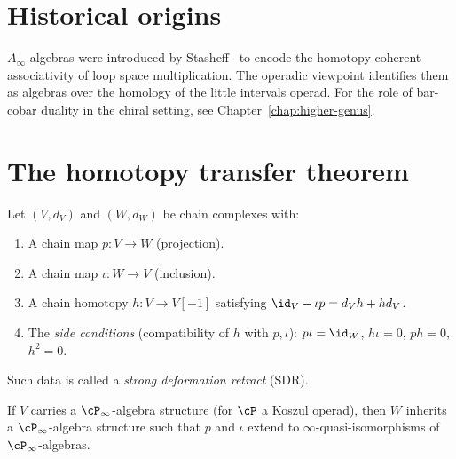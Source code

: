 \section{Historical origins}
\label{sec:ainfty-historical}

$A_\infty$ algebras were introduced by Stasheff~\cite{Sta63} to encode the homotopy-coherent associativity of loop space multiplication. The operadic viewpoint identifies them as algebras over the homology of the little intervals operad. For the role of bar-cobar duality in the chiral setting, see Chapter~\ref{chap:higher-genus}.

\section{The homotopy transfer theorem}
\label{sec:htt}

\begin{theorem}
\label{thm:htt}
Let $(V, d_V)$ and $(W, d_W)$ be chain complexes with:
\begin{enumerate}[label=(\roman*)]
\item A chain map $p: V \to W$ (projection).
\item A chain map $\iota: W \to V$ (inclusion).
\item A chain homotopy $h: V \to V[-1]$ satisfying $\id_V - \iota p = d_V h + h d_V$.
\item The \emph{side conditions} (compatibility of $h$ with $p, \iota$): $p \iota = \id_W$, $h \iota = 0$, $p h = 0$, $h^2 = 0$.
\end{enumerate}
Such data is called a \emph{strong deformation retract} (SDR).

If $V$ carries a $\cP_\infty$-algebra structure (for $\cP$ a Koszul operad),
then $W$ inherits a $\cP_\infty$-algebra structure such that $p$ and $\iota$
extend to $\infty$-quasi-isomorphisms of $\cP_\infty$-algebras.
\end{theorem}

